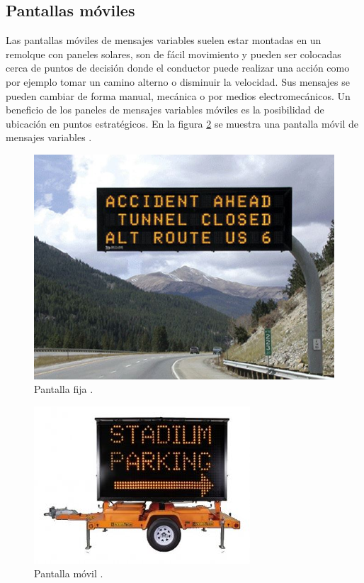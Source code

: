 \subsection{Pantallas móviles}

Las pantallas móviles de mensajes variables suelen estar montadas en un remolque con paneles solares, son de fácil movimiento y pueden ser colocadas cerca de puntos de decisión donde el conductor puede realizar una acción como por ejemplo tomar un camino alterno o disminuir la velocidad. Sus mensajes se pueden cambiar de forma manual, mecánica o por medios electromecánicos. Un beneficio de los paneles de mensajes variables móviles es la posibilidad de ubicación en puntos estratégicos. En la figura \ref{fig:vmsm} se muestra una pantalla móvil de mensajes variables \citep{VMSTYPES}.

\begin{figure}[htpb]
	\centering
	\includegraphics[width=.9 \textwidth]{../Figures/vmspermanente.jpg} 
	\caption{Pantalla fija \protect\footnotemark.}
	\label{fig:vmsp}
\end{figure}


\begin{figure}[htpb]
	\centering
	\includegraphics[width=.7\textwidth]{../Figures/vmsmovil.jpg} 
	\caption{Pantalla móvil \protect\footnotemark.}
	\label{fig:vmsm}
\end{figure}

